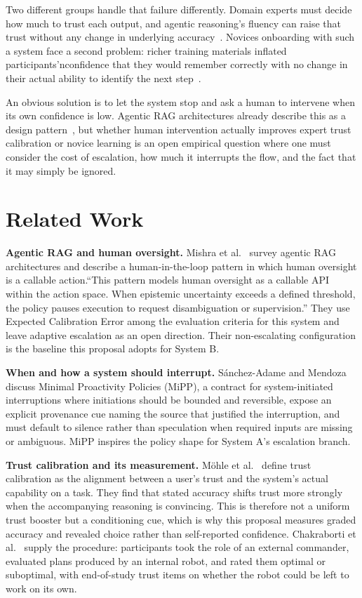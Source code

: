 \documentclass[sigconf,nonacm]{acmart}
\begin{document}
Two different groups handle that failure differently. Domain experts must decide
how much to trust each output, and agentic reasoning's fluency can raise
that trust without any change in underlying accuracy~\cite{mohle2026}.
Novices onboarding with such a system face a second problem: richer training materials inflated participants’nconfidence that they would remember correctly with no change in their
actual ability to identify the next step~\cite{clegg2022}.

An obvious solution is to let the system stop and ask a human to intervene when its own
confidence is low. Agentic RAG architectures already describe this as a
design pattern~\cite{mishra2026}, but whether human intervention actually improves
expert trust calibration or novice learning is an open empirical question where one must consider the cost of escalation, how much it interrupts the flow, and the fact that it may simply be ignored.

\section{Related Work}
\label{sec:related}

\textbf{Agentic RAG and human oversight.} Mishra et al.~\cite{mishra2026}
survey agentic RAG architectures and describe a human-in-the-loop pattern
in which human oversight is a callable action.“This pattern models human oversight
as a callable API within the action space. When epistemic uncertainty
exceeds a defined threshold, the policy pauses execution to request disambiguation or supervision.” They use Expected Calibration Error among the evaluation
criteria for this system and leave adaptive escalation as an open
direction. Their non-escalating configuration is the baseline this proposal
adopts for System B.

\textbf{When and how a system should interrupt.} S\'anchez-Adame and
Mendoza~\cite{sanchezadame2026} discuss Minimal Proactivity Policies
(MiPP), a contract for system-initiated interruptions where initiations should
be bounded and reversible, expose an explicit provenance cue naming
the source that justified the interruption, and must default to
silence rather than speculation when required inputs are missing or
ambiguous. MiPP inspires the policy shape for System A's escalation
branch.

\textbf{Trust calibration and its measurement.} M\"ohle
et al.~\cite{mohle2026} define trust calibration as the alignment between a
user's trust and the system's actual capability on a task. They find that stated accuracy shifts trust more strongly when the accompanying reasoning is convincing. This is therefore not a uniform trust booster but a conditioning cue, which is why this
proposal measures graded accuracy and revealed choice rather than
self-reported confidence. Chakraborti et al.~\cite{chakraborti2018} supply
the procedure: participants took the role of an external commander,
evaluated plans produced by an internal robot, and rated them optimal or
suboptimal, with end-of-study trust items on whether the robot could be
left to work on its own.
\end{document}
